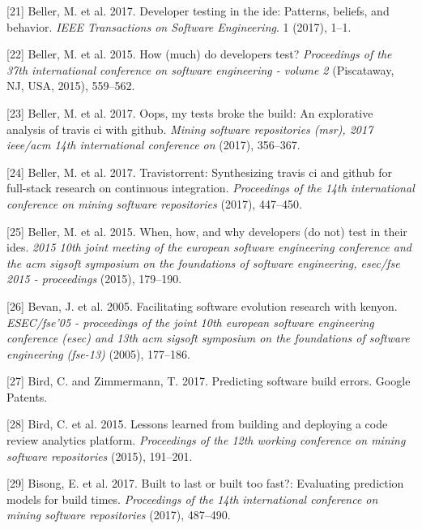 \documentclass[]{book}
\begin{document}
\hypertarget{ref-beller2017developer}{}
{[}21{]} Beller, M. et al. 2017. Developer testing in the ide: Patterns,
beliefs, and behavior. \emph{IEEE Transactions on Software Engineering}.
1 (2017), 1--1.

\hypertarget{ref-Beller:2015:DT:2819009.2819101}{}
{[}22{]} Beller, M. et al. 2015. How (much) do developers test?
\emph{Proceedings of the 37th international conference on software
engineering - volume 2} (Piscataway, NJ, USA, 2015), 559--562.

\hypertarget{ref-beller2017oops}{}
{[}23{]} Beller, M. et al. 2017. Oops, my tests broke the build: An
explorative analysis of travis ci with github. \emph{Mining software
repositories (msr), 2017 ieee/acm 14th international conference on}
(2017), 356--367.

\hypertarget{ref-beller2017travistorrent}{}
{[}24{]} Beller, M. et al. 2017. Travistorrent: Synthesizing travis ci
and github for full-stack research on continuous integration.
\emph{Proceedings of the 14th international conference on mining
software repositories} (2017), 447--450.

\hypertarget{ref-beller2015}{}
{[}25{]} Beller, M. et al. 2015. When, how, and why developers (do not)
test in their ides. \emph{2015 10th joint meeting of the european
software engineering conference and the acm sigsoft symposium on the
foundations of software engineering, esec/fse 2015 - proceedings}
(2015), 179--190.

\hypertarget{ref-bevan2005}{}
{[}26{]} Bevan, J. et al. 2005. Facilitating software evolution research
with kenyon. \emph{ESEC/fse'05 - proceedings of the joint 10th european
software engineering conference (esec) and 13th acm sigsoft symposium on
the foundations of software engineering (fse-13)} (2005), 177--186.

\hypertarget{ref-bird2017predicting}{}
{[}27{]} Bird, C. and Zimmermann, T. 2017. Predicting software build
errors. Google Patents.

\hypertarget{ref-bird2015lessons}{}
{[}28{]} Bird, C. et al. 2015. Lessons learned from building and
deploying a code review analytics platform. \emph{Proceedings of the
12th working conference on mining software repositories} (2015),
191--201.

\hypertarget{ref-bisong2017built}{}
{[}29{]} Bisong, E. et al. 2017. Built to last or built too fast?:
Evaluating prediction models for build times. \emph{Proceedings of the
14th international conference on mining software repositories} (2017),
487--490.
\end{document}

